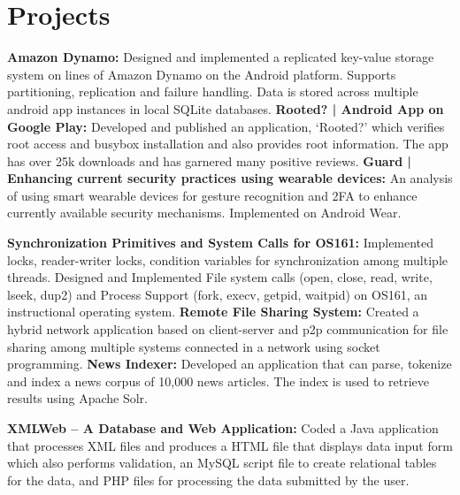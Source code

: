 \documentclass[11pt,a4paper,sans]{moderncv}        %
\begin{document}
\section{Projects}
{\textbf{Amazon Dynamo: }Designed and implemented a replicated key-value storage system on lines of Amazon Dynamo on the Android
platform. Supports partitioning, replication and failure handling. Data is stored across multiple android app instances
in local SQLite databases.}
\cvitem {}
{\textbf{Rooted? | Android App on Google Play: }Developed and published an application, ‘Rooted?’ which verifies root access and
busybox installation and also provides root information. The app has over 25k downloads and has garnered many positive reviews. }
\cvitem {}
{\textbf{Guard | Enhancing current security practices using wearable devices: }An analysis of using smart wearable devices for gesture recognition and 2FA to enhance currently available security mechanisms. Implemented on Android Wear.}

{\textbf{Synchronization Primitives and System Calls for OS161: }Implemented locks, reader-writer locks, condition variables for synchronization among multiple threads. Designed
and Implemented File system calls (open, close, read, write, lseek, dup2) and Process Support (fork, execv, getpid,
waitpid) on OS161, an instructional operating system.}
{\textbf{Remote File Sharing System: }Created a hybrid network application based on client-server and p2p communication for file sharing among multiple systems connected in a network using socket programming.}
{\textbf{News Indexer: }Developed an application that can parse, tokenize and index a news corpus of 10,000 news articles. The index is used to retrieve results using Apache Solr.}

{\textbf{XMLWeb – A Database and Web Application: }Coded a Java application that processes XML files and produces a HTML file that displays data input form which also performs validation, an MySQL script file to create relational tables for the data, and PHP files for processing the data submitted by the user.}
\clearpage
\thispagestyle{empty}
\end{document}
